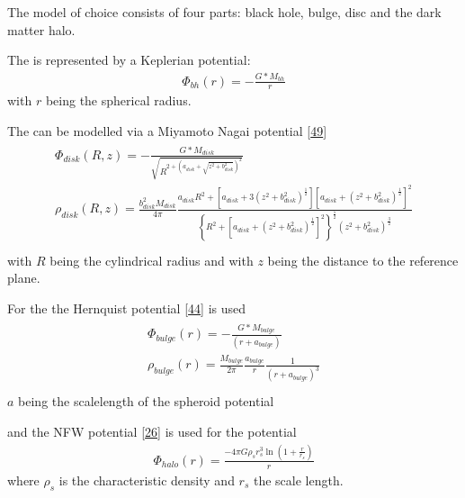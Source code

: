 \documentclass[letterpaper,10pt,english]{sphinxmanual}
\begin{document}
\sphinxAtStartPar
The model of choice consists of four parts: black hole, bulge, disc and the dark matter halo.

\sphinxAtStartPar
The  is represented by a Keplerian potential:
\begin{equation*}
\begin{split}\Phi_{bh}\left ( r \right ) = -\frac{G*M_{bh}}{r}\end{split}
\end{equation*}
\sphinxAtStartPar
with \(r\) being the spherical radius.

\sphinxAtStartPar
The  can be modelled via a Miyamoto Nagai potential {[}\hyperlink{cite.NBodySimulation/Appendix:id3}{49}{]}
\begin{align*}\!\begin{aligned}
\Phi_{disk}\left ( R,z \right ) = -\frac{G*M_{disk}}{\sqrt{R^{2+\left ( a_{disk}+\sqrt{z^{2}+b_{disk}^{2}} \right )^{2}}}}\\
\rho_{disk}(R,z)=\frac{b_{disk}^{2}M_{disk}}{4\pi}\frac{a_{disk}R^{2}+\left[a_{disk}+3(z^{2}+b_{disk}^{2})^{\frac{1}{2}}\right]\left[a_{disk}+(z^{2}+b_{disk}^{2})^{\frac{1}{2}}\right]^{2}}{\left \{ R^{2}+\left[a_{disk}+(z^{2}+b_{disk}^{2})^{\frac{1}{2}}\right]^{2} \right \}^{\frac{5}{2}}\left(z^{2}+b_{disk}^{2}\right)^{\frac{3}{2}}}\\
\end{aligned}\end{align*}
\sphinxAtStartPar
with \(R\) being the cylindrical radius and with \(z\) being the distance to the reference plane.

\sphinxAtStartPar
For the  the Hernquist potential {[}\hyperlink{cite.NBodySimulation/Appendix:id6}{44}{]} is used
\begin{align*}\!\begin{aligned}
\Phi_{bulge}\left ( r \right ) = -\frac{G*M_{bulge}}{\left ( r+a_{bulge} \right )}\\
\rho_{bulge}(r)= \frac{M_{bulge}}{2\pi }\frac{a_{bulge}}{r}\frac{1}{\left ( r+a_{bulge} \right )^{3}}\\
\end{aligned}\end{align*}
\sphinxAtStartPar
\(a\) being the scale\sphinxhyphen{}length of the spheroid potential

\sphinxAtStartPar
and the NFW potential {[}\hyperlink{cite.NBodySimulation/Appendix:id59}{26}{]} is used for the  potential
\begin{equation*}
\begin{split}\Phi_{halo}\left ( r \right ) = \frac{-4\pi G\rho _{s}r_{s}^{3}\ln\left ( 1+\frac{r}{r_{s}}\right )}{r}\end{split}
\end{equation*}
\sphinxAtStartPar
where \(\rho _{s}\) is the characteristic density and \(r_{s}\) the scale length.
\end{document}
